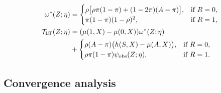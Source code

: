 \documentclass{article}
\theoremstyle{plain}
\theoremstyle{definition}
\theoremstyle{remark}
\newcommand{\1}{\mathds{1}}                %
\begin{document}
\vspace{-0.5cm}
\footnotesize
\begin{align*}
    \omega^*(Z;\eta) &= \begin{cases} 
      \rho \big[ \rho\pi(1-\pi) + (1-2\pi)(A-\pi) \big] , & \text{if } R=0 , \\
      \pi(1-\pi)(1-\rho)^2 , & \text{if } R=1 ,
   \end{cases} \\
    \mathcal{T}_\mathrm{LT}(Z;\eta) &= (\mu(1,X)-\mu(0,X))\omega^*(Z;\eta) \notag \\
    &+ \begin{cases} 
     \rho(A-\pi)\big( h(S,X) - \mu(A,X) \big) , & \text{if } R=0 , \\
      \rho \pi(1-\pi) \psi_\mathrm{obs}(Z;\eta) , & \text{if } R=1 .
   \end{cases}
\end{align*}
\vspace{-0.5cm}
\normalsize



\subsection{Convergence analysis} 
\label{subsec:convergence}
\end{document}
